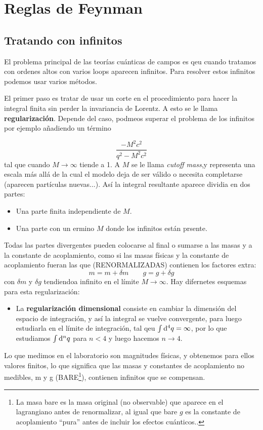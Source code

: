 \section{Reglas de Feynman}

\subsection{Tratando con infinitos}

El problema principal de las teorías cuánticas de campos es qeu cuando tratamos con ordenes altos con varios loops aparecen infinitos. Para resolver estos infinitos podemos usar varios métodos.

El primer paso es tratar de usar un corte en el procedimiento para hacer la integral finita sin perder la invariancia de Lorentz. A esto se le llama \textbf{regularización}. Depende del caso, podmeos superar el problema de los infinitos por ejemplo añadiendo un término


\begin{equation*}
    \frac{-M^2 c^2}{q^2 - M^2 c^2}
\end{equation*}
tal que cuando $M\rightarrow \infty$ tiende a 1. A $M$ se le llama \textit{cutoff mass},y representa una escala más allá de la cual el modelo deja de ser válido o necesita completarse (aparecen partículas nuevas...). Así la integral resultante aparece dividia en dos partes:

\begin{itemize}
    \item Una parte finita independiente de $M$.
    \item Una parte con un ermino $M$ donde los infinitos están prsente. 
\end{itemize} 
Todas las partes divergentes pueden colocarse al final o sumarse a las masas y a la constante de acoplamiento, como si las masas físicas y la constante de acoplamiento fueran las que (RENORMALIZADAS) contienen los factores extra:
\[ 
    m =m+\delta m \qquad g =g+\delta g
\]
con $\delta m $ y $\delta g$ tendiendoa infinito en el límite $M\to \infty$. Hay difernetes esquemas para esta regularización:


\begin{itemize}
    \item La \textbf{regularización dimensional} consiste en cambiar la dimensión del espacio de integración, y así la integral se vuelve convergente, para luego estudiarla en el límite de integración, tal qeu $\int \mathrm{d}^4 q = \infty$, por lo que estudiamos $\int \mathrm{d}^n q$ para $n<4$ y luego hacemos $n\to 4$. 
\end{itemize}
Lo que medimos en el laboratorio son magnitudes físicas, y obtenemos para ellos valores finitos, lo que significa que las masas y constantes de acoplamiento no medibles, m y g (BARE\footnote{La masa bare es la masa original (no observable) que aparece en el lagrangiano antes de renormalizar, al igual que bare $g$ es la constante de acoplamiento ``pura'' antes de incluir los efectos cuánticos..}), contienen infinitos que se compensan.

